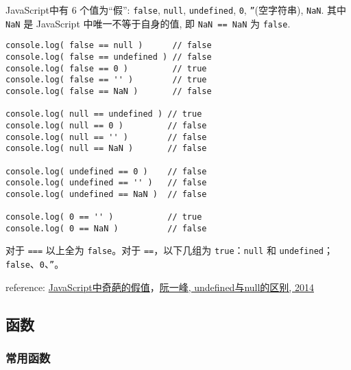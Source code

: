 JavaScript中有 6 个值为“假”: \texttt{false}, \texttt{null}, \texttt{undefined}, \texttt{0}, \texttt{''}(空字符串), \texttt{NaN}. 其中 \texttt{NaN} 是 JavaScript 中唯一不等于自身的值, 即 \texttt{NaN == NaN} 为 \texttt{false}.

\begin{verbatim}console.log( false == null )      // false
console.log( false == undefined ) // false
console.log( false == 0 )         // true
console.log( false == '' )        // true
console.log( false == NaN )       // false

console.log( null == undefined ) // true
console.log( null == 0 )         // false
console.log( null == '' )        // false
console.log( null == NaN )       // false

console.log( undefined == 0 )    // false
console.log( undefined == '' )   // false
console.log( undefined == NaN )  // false

console.log( 0 == '' )           // true
console.log( 0 == NaN )          // false
\end{verbatim}

对于 \texttt{===} 以上全为 \texttt{false}。对于 \texttt{==}，以下几组为 \texttt{true}：\texttt{null} 和 \texttt{undefined}；\texttt{false}、\texttt{0}、\texttt{''}。

reference: \href{http://www.cnblogs.com/snandy/p/3589517.html}{JavaScript中奇葩的假值}，\href{http://www.ruanyifeng.com/blog/2014/03/undefined-vs-null.html}{阮一峰, undefined与null的区别, 2014}

\subsection{函数}\hypertarget{section-2}{}\label{section-2}

\subsubsection{常用函数}\hypertarget{section-3}{}\label{section-3}


